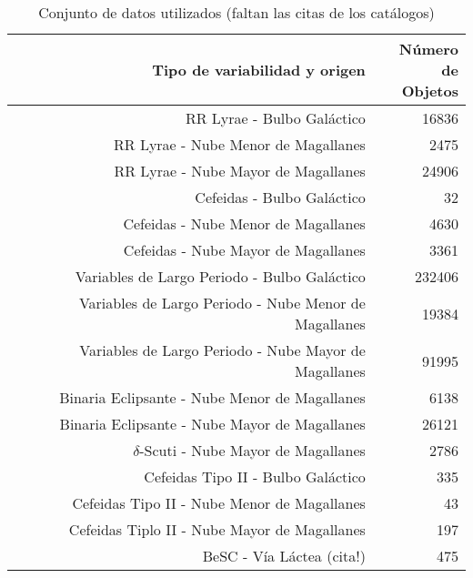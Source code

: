 \documentclass[letterpaper,12pt]{book}
\begin{document}
\begin{table}
  \centering
  \begin{tabular}{rr}
    \hline
    \hline
    Tipo de variabilidad y origen & \shortstack{Número \\de Objetos}\\
    \hline
    \hline
    RR Lyrae - Bulbo Galáctico\cite{soszynski_optical_2011-2} & 16836\\
    RR Lyrae - Nube Menor de Magallanes \cite{soszynski_optical_2010}& 2475\\
    RR Lyrae - Nube Mayor de Magallanes \cite{soszynski_optical_2009-1}& 24906\\
    \hline
    Cefeidas - Bulbo Galáctico \cite{soszynski_optical_2011}& 32\\%
    Cefeidas - Nube Menor de Magallanes \cite{soszynski_optical_2010-2}& 4630\\
    Cefeidas - Nube Mayor de Magallanes \cite{soszynski_optical_2008-1}& 3361\\
    \hline
    Variables de Largo Periodo - Bulbo Galáctico \cite{soszynski_optical_2013-1}& 232406\\
    Variables de Largo Periodo - Nube Menor de Magallanes \cite{soszynski_optical_2011-1}& 19384\\
    Variables de Largo Periodo - Nube Mayor de Magallanes \cite{soszynski_optical_2009}& 91995\\
    \hline
    Binaria Eclipsante - Nube Menor de Magallanes \cite{pawlak_eclipsing_2013}& 6138\\
    Binaria Eclipsante - Nube Mayor de Magallanes \cite{graczyk_optical_2011}& 26121\\
    \hline
    $\delta$-Scuti - Nube Mayor de Magallanes\cite{poleski_optical_2010} & 2786\\
    \hline
    Cefeidas Tipo II - Bulbo Galáctico \cite{soszynski_optical_2013}& 335\\
    Cefeidas Tipo II - Nube Menor de Magallanes \cite{soszynski_optical_2010-1}& 43\\
    Cefeidas Tiplo II - Nube Mayor de Magallanes \cite{soszynski_optical_2008}& 197\\
    \hline
    BeSC -  Vía Láctea (cita!) & 475\\
    \hline
    \hline 
  \end{tabular}
  \caption{Conjunto de datos utilizados (faltan las citas de los catálogos)}
  \label{cuadro:datosUsados}   
\end{table}
\end{document}
